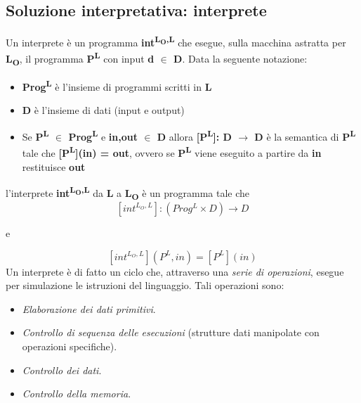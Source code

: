 \documentclass[a4paper,oneside,titlepage]{book}
\begin{document}
\subsection{Soluzione interpretativa: interprete}
Un interprete è un programma \textbf{int\textsuperscript{L\textsubscript{O},L}} che esegue, sulla macchina astratta per \textbf{L\textsubscript{O}}, il programma \textbf{P\textsuperscript{L}} con input \textbf{d $\in$ D}. Data la seguente notazione:
\begin{itemize}
	\item \textbf{Prog\textsuperscript{L}} è l'insieme di programmi scritti in \textbf{L}
	\item \textbf{D} è l'insieme di dati (input e output)
	\item Se \textbf{P\textsuperscript{L} $\in$ Prog\textsuperscript{L}} e \textbf{in,out $\in$ D} allora \textbf{[P\textsuperscript{L}]: D $\rightarrow$ D} è la semantica di \textbf{P\textsuperscript{L}} tale che \textbf{[P\textsuperscript{L}](in) = out}, ovvero se \textbf{P\textsuperscript{L}} viene eseguito a partire da \textbf{in} restituisce \textbf{out}
\end{itemize}
l'interprete \textbf{int\textsuperscript{L\textsubscript{O},L}} da \textbf{L} a \textbf{L\textsubscript{O}} è un programma tale che
\[ [int^{L_{O},L}]: (Prog^{L} \times D) \rightarrow D \]
\begin{center}
	e
\end{center}
\[ [int^{L_{O},L}](P^{L},in) = [P^{L}](in) \]
Un interprete è di fatto un ciclo che, attraverso una \textit{serie di operazioni}, esegue per simulazione le istruzioni del linguaggio.
\newpage
\noindent
Tali operazioni sono:
\begin{itemize}
	\item \textit{Elaborazione dei dati primitivi}.
	\item \textit{Controllo di sequenza delle esecuzioni} (strutture dati manipolate con operazioni specifiche).
	\item \textit{Controllo dei dati}.
	\item \textit{Controllo della memoria}.
\end{itemize}
\end{document}
